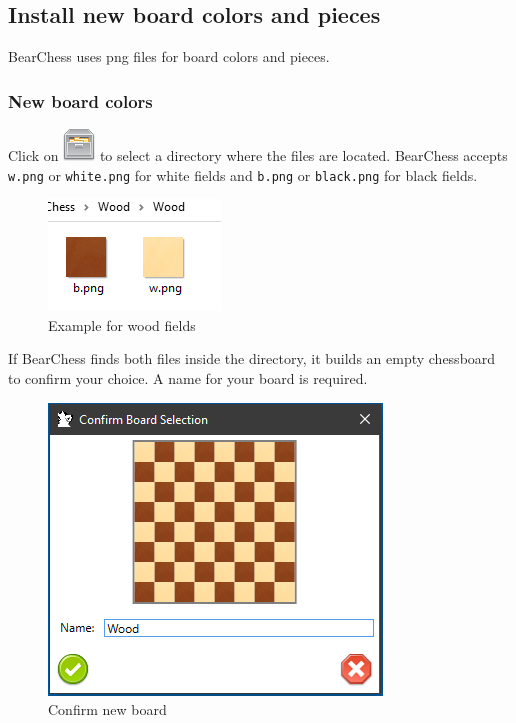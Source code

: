 \documentclass[11pt,a4paper]{article}
\begin{document}
\subsection{Install new board colors and pieces}
BearChess uses png files for board colors and pieces.

\subsubsection{New board colors}
Click on \includegraphics[scale=0.5]{file_manager.png} to select a directory where the files are located. BearChess accepts \verb|w.png| or \verb|white.png| for white fields and \verb|b.png| or \verb|black.png| for black fields.

\begin{figure}[H]
	\centering
	\includegraphics[scale=1.0]{WoodPieces.png}
	\caption{Example for wood fields }
	\label{fig:WoodPieces}
\end{figure}

If BearChess finds both files inside the directory, it builds an empty chessboard to confirm your choice. A name for your board is required.

\begin{figure}[H]
	\centering
	\includegraphics[scale=1.0]{ConfirmBoard.png}
	\caption{Confirm new board }
	\label{fig:ConfirmBoard}
\end{figure}
\end{document}
